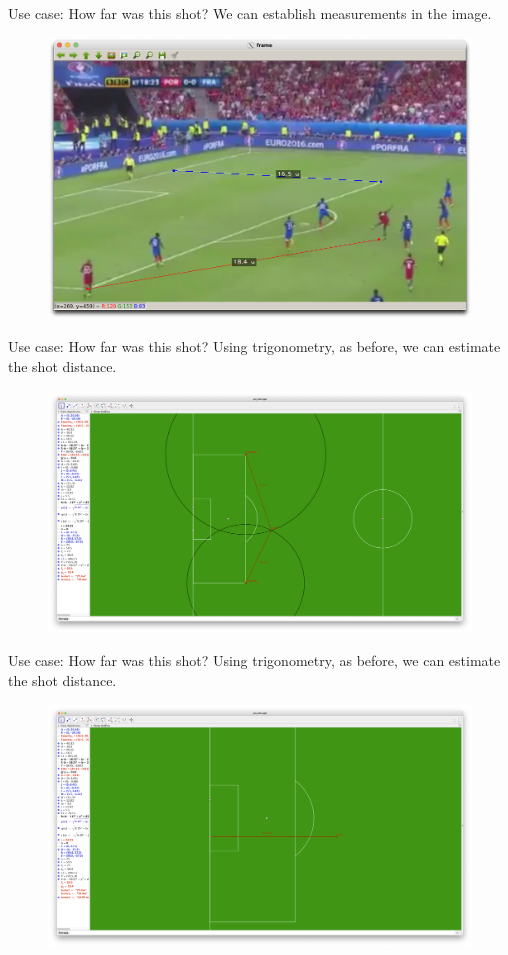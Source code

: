 \begin{frame}{\secname}{Use case: How far was this shot?}
    We can establish measurements in the image.
    \begin{figure}
        \includegraphics[width=0.7\textheight]{img/Medida_HomogOrig_Final}
    \end{figure}
\end{frame}

\begin{frame}{\secname}{Use case: How far was this shot?}
    Using trigonometry, as before, we can estimate the shot distance.
    \begin{figure}
        \includegraphics[width=\textwidth]{img/posicion-eder}
    \end{figure}
\end{frame}

\begin{frame}{\secname}{Use case: How far was this shot?}
    Using trigonometry, as before, we can estimate the shot distance.
    \begin{figure}
        \includegraphics[width=\textwidth]{img/medida-eder}
    \end{figure}
\end{frame}

